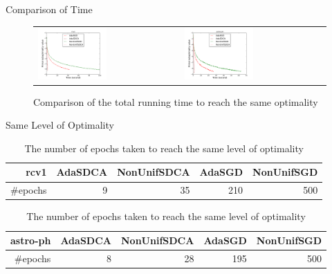 \begin{frame}{Comparison of Time}
\begin{figure}[htbp]
\begin{tabular}{ll}
    \centering
        \includegraphics[width=0.5\textwidth]{images/comp_adas_time_rcv1.pdf} &
        \includegraphics[width=0.5\textwidth]{images/comp_adas_time_astro.pdf}
\end{tabular}
        \caption{Comparison of the total running time to reach the same optimality}
     \label{fig:adatime}
\end{figure}
\end{frame}

\begin{frame}{Same Level of Optimality}
\begin{table}[htbp]
    \centering
    \caption{The number of epochs taken to reach the same level of optimality}
    \label{table:timetable}
    \begin{tabular}{|r|r|r|r|r|}
        \hline 
        rcv1 & AdaSDCA & NonUnifSDCA & AdaSGD & NonUnifSGD \\
        \hline
        \#epochs & 9 & 35 & 210 & 500 \\         
        \hline
    \end{tabular}
    \begin{tabular}{|r|r|r|r|r|}
        \hline 
        astro-ph & AdaSDCA & NonUnifSDCA & AdaSGD & NonUnifSGD \\
        \hline
        \#epochs & 8 & 28 & 195 & 500 \\         
        \hline
    \end{tabular}    
\end{table}
\end{frame}

